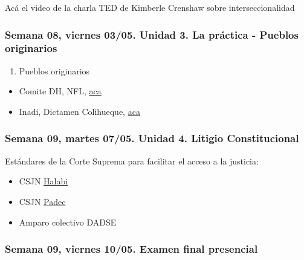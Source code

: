 \documentclass[
]{article}
\providecommand{\tightlist}{%
  \setlength{\itemsep}{0pt}\setlength{\parskip}{0pt}}
\begin{document}
Acá el video de la charla TED de Kimberle Crenshaw sobre
interseccionalidad

\hypertarget{semana-08-viernes-0305.-unidad-3.-la-pruxe1ctica---pueblos-originarios}{%
\subsubsection{Semana 08, viernes 03/05. Unidad 3. La práctica - Pueblos
originarios}\label{semana-08-viernes-0305.-unidad-3.-la-pruxe1ctica---pueblos-originarios}}

\begin{enumerate}
\def\labelenumi{\alph{enumi}.}
\setcounter{enumi}{5}
\tightlist
\item
  Pueblos originarios
\end{enumerate}

\begin{itemize}
\item
  Comite DH, NFL,
  \href{https://drive.google.com/file/d/1CP_TpEaI6XXZIb3ACuyqa8XFPuvbdR3f/view?usp=sharing}{aca}
\item
  Inadi, Dictamen Colihueque,
  \href{https://drive.google.com/file/d/1_t9jnOgqHc9qw7PyU6nuJS0_VORXtdLj/view?usp=sharing¨}{aca}
\end{itemize}

\hypertarget{semana-09-martes-0705.-unidad-4.-litigio-constitucional}{%
\subsubsection{Semana 09, martes 07/05. Unidad 4. Litigio
Constitucional}\label{semana-09-martes-0705.-unidad-4.-litigio-constitucional}}

Estándares de la Corte Suprema para facilitar el acceso a la justicia:

\begin{itemize}
\item
  CSJN
  \href{https://drive.google.com/file/d/1EcDi8VnbuUNH7DlaRPhTMit0IGLLGn0d/view?usp=sharing}{Halabi}
\item
  CSJN
  \href{https://drive.google.com/file/d/186eN_fSToqx4d_W2fRI2pckZA3a5CWCH/view?usp=sharing}{Padec}
\item
  Amparo colectivo DADSE
\end{itemize}

\hypertarget{semana-09-viernes-1005.-examen-final-presencial}{%
\subsubsection{Semana 09, viernes 10/05. Examen final
presencial}\label{semana-09-viernes-1005.-examen-final-presencial}}
\end{document}
